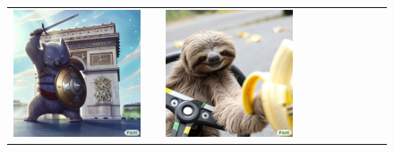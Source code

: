 \begin{figure}[ht!]
\begin{adjustwidth}{-0.8in}{-0.5in}  
\centering                     
\footnotesize
\setlength\tabcolsep{1pt}
\begin{tabular}{cccccccccccccccccccc}
\multicolumn{6}{c}{\includegraphics[width=\thirdcolwidth\textwidth]{figures/cherries/wombat_warrior.jpg}} &&
\multicolumn{6}{c}{\includegraphics[width=\thirdcolwidth\textwidth]{figures/cherries/sloth_kart_1.jpg}} &&

\end{tabular}
\end{adjustwidth}
\end{figure}
